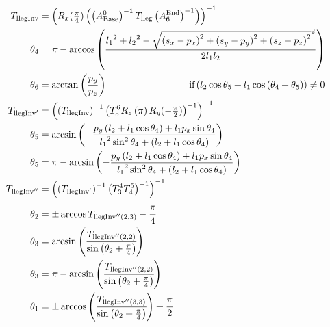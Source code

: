 \begin{align*}
T_\text{llegInv} &= \left(R_x(\tfrac{\pi}{4})\left(\left(A^0_\text{Base}\right)^{-1} T_\text{lleg} \left(A^\text{End}_6\right)^{-1}\right)\right)^{-1} \\
\theta_4 &=\pi - \arccos\left(\frac{{l_1}^2 + {l_2}^2 - \sqrt{\left(s_x-p_x\right)^2 + \left(s_y-p_y\right)^2 + \left(s_z-p_z\right)^2}^2}{2 l_1 l_2}\right) \\
\theta_6 &= \arctan\left(\frac{p_y}{p_z}\right)\hspace{3cm}\text{if} \left(l_2\cos\theta_5 + l_1 \cos\left(\theta_4 + \theta_5\right)\right) \neq 0 \\
T_{\text{llegInv}'} &= \left(\left(T_\text{llegInv}\right)^{-1}\left(T^6_5R_z\left(\pi\right)R_y(-\tfrac{\pi}{2})\right)^{-1}\right)^{-1} \\
\theta_5 &= \arcsin\left(-\frac{p_y\left(l_2+l_1\cos\theta_4\right) + l_1p_x\sin\theta_4}{{l_1}^2\sin^2\theta_4 + \left(l_2 + l_1\cos\theta_4\right)}\right) \\
\theta_5 &= \pi - \arcsin\left(-\frac{p_y\left(l_2+l_1\cos\theta_4\right) + l_1p_x\sin\theta_4}{{l_1}^2\sin^2\theta_4 + \left(l_2 + l_1\cos\theta_4\right)}\right)\\
T_{\text{llegInv}''} &= \left(\left(T_{\text{llegInv}'}\right)^{-1}\left(T^4_3T^5_4\right)^{-1}\right)^{-1} \\
\theta_2 &= \pm\arccos T_{\text{llegInv}''(2,3)} - \cfrac{\pi}{4} \\
\theta_3 &= \arcsin\left(\cfrac{T_{\text{llegInv}''(2,2)}}{\sin\left(\theta_2+\frac{\pi}{4}\right)}\right) \\
\theta_3 &= \pi - \arcsin\left(\cfrac{T_{\text{llegInv}''(2,2)}}{\sin\left(\theta_2+\frac{\pi}{4}\right)}\right) \\
\theta_1 &= \pm\arccos\left(\cfrac{T_{\text{llegInv}''(3,3)}}{\sin\left(\theta_2+\frac{\pi}{4}\right)}\right) + \cfrac{\pi}{2}
\end{align*}


